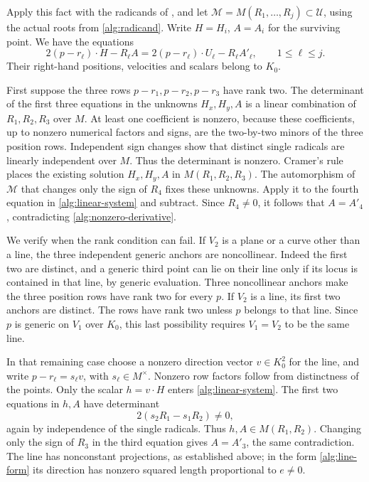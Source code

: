 Apply this fact with the radicands of
, and let
\(\mathcal M=M(R_1,\ldots,R_j)\subset\mathcal U\), using the
actual roots from \eqref{alg:radicand}. Write \(H=H_i\), \(A=A_i\)
for the surviving point. We have the equations
\begin{equation}\label{alg:linear-system}
 2(p-r_\ell)\cdot H-R_\ell A
   =2(p-r_\ell)\cdot U_\ell-R_\ell A'_\ell,
 \qquad 1\le\ell\le j.
\end{equation}
Their right-hand positions, velocities and scalars belong to \(K_0\).

First suppose the three rows \(p-r_1,p-r_2,p-r_3\) have rank two.
The determinant of the first three equations in the unknowns
\(H_x,H_y,A\) is a linear combination of \(R_1,R_2,R_3\) over
\(M\). At least one coefficient is nonzero, because these
coefficients, up to nonzero numerical factors and signs, are the
two-by-two minors of the three position rows. Independent sign
changes show that distinct single radicals are linearly independent
over \(M\). Thus the determinant is nonzero. Cramer's rule places
the existing solution \(H_x,H_y,A\) in \(M(R_1,R_2,R_3)\).
The automorphism of \(\mathcal M\) that changes only the sign of
\(R_4\) fixes these unknowns. Apply it to the fourth equation in
\eqref{alg:linear-system} and subtract. Since \(R_4\ne0\), it
follows that \(A=A'_4\), contradicting
\eqref{alg:nonzero-derivative}.

We verify when the rank condition can fail. If \(V_2\) is a plane
or a curve other than a line, the three independent generic anchors
are noncollinear. Indeed the first two are distinct, and a generic
third point can lie on their line only if its locus is contained
in that line, by generic evaluation. Three noncollinear anchors
make the three position rows have rank two for every \(p\).
If \(V_2\) is a line, its first two anchors are distinct. The rows
have rank two unless \(p\) belongs to that line. Since \(p\) is
generic on \(V_1\) over \(K_0\), this last possibility requires
\(V_1=V_2\) to be the same line.

In that remaining case choose a nonzero direction vector
\(v\in K_0^2\) for the line, and write
\(p-r_\ell=s_\ell v\), with \(s_\ell\in M^\times\).
Nonzero row factors follow from distinctness of the points.
Only the scalar \(h=v\cdot H\) enters
\eqref{alg:linear-system}. The first two equations in \(h,A\)
have determinant
\[
 2(s_2R_1-s_1R_2)\ne0,
\]
again by independence of the single radicals. Thus
\(h,A\in M(R_1,R_2)\). Changing only the sign of \(R_3\) in
the third equation gives \(A=A'_3\), the same contradiction.
The line has nonconstant projections, as established above; in
the form \eqref{alg:line-form} its direction has nonzero squared
length proportional to \(e\ne0\).

